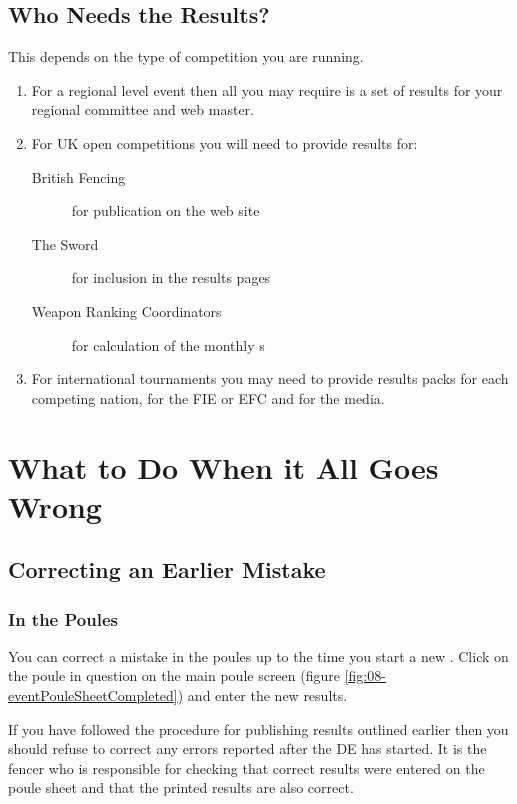 \documentclass[a4paper,11pt]{memoir}
\begin{document}
\section{Who Needs the Results?}

This depends on the type of competition you are running.

\begin{enumerate}
 \item For a regional level \gls{event} then all you may require is a set of results for your regional committee and web master.
 \item For UK open competitions you will need to provide results for:
 \begin{description}
  \item[British Fencing] for publication on the web site
  \item[The Sword] for inclusion in the results pages
  \item[Weapon Ranking Coordinators] for calculation of the monthly s
 \end{description}
 \item For international tournaments you may need to provide results packs for each competing nation, for the FIE or EFC and for the media.
\end{enumerate}

\chapter{What to Do When it All Goes Wrong}

\section{Correcting an Earlier Mistake}

\subsection{In the Poules}

You can correct a mistake in the poules up to the time you start a new . Click on the poule in question on the main poule screen (figure \ref{fig:08-eventPouleSheetCompleted}) and enter the new results. 

If you have followed the procedure for publishing results outlined earlier then you should refuse to correct any errors reported after the DE has started. It is the fencer who is responsible for checking that correct results were entered on the poule sheet and that the printed results are also correct.
\end{document}
